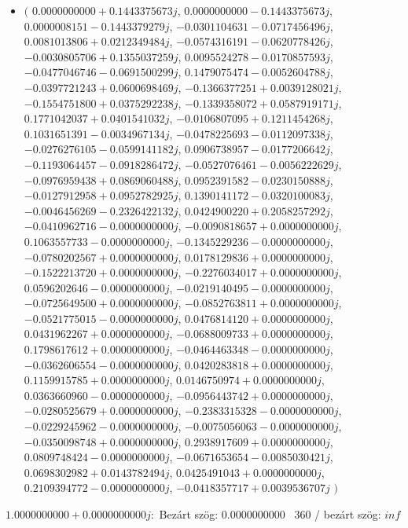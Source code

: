 \documentclass[14pt,a4paper]{article}
\begin{document}
\begin{itemize}
\item
$\big($
$0.0000000000+0.1443375673j$, $0.0000000000-0.1443375673j$, $0.0000008151-0.1443379279j$, $-0.0301104631-0.0717456496j$, $0.0081013806+0.0212349484j$, $-0.0574316191-0.0620778426j$, $-0.0030805706+0.1355037259j$, $0.0095524278-0.0170857593j$, $-0.0477046746-0.0691500299j$, $0.1479075474-0.0052604788j$, $-0.0397721243+0.0600698469j$, $-0.1366377251+0.0039128021j$, $-0.1554751800+0.0375292238j$, $-0.1339358072+0.0587919171j$, $0.1771042037+0.0401541032j$, $-0.0106807095+0.1211454268j$, $0.1031651391-0.0034967134j$, $-0.0478225693-0.0112097338j$, $-0.0276276105-0.0599141182j$, $0.0906738957-0.0177206642j$, $-0.1193064457-0.0918286472j$, $-0.0527076461-0.0056222629j$, $-0.0976959438+0.0869060488j$, $0.0952391582-0.0230150888j$, $-0.0127912958+0.0952782925j$, $0.1390141172-0.0320100083j$, $-0.0046456269-0.2326422132j$, $0.0424900220+0.2058257292j$, $-0.0410962716-0.0000000000j$, $-0.0090818657+0.0000000000j$, $0.1063557733-0.0000000000j$, $-0.1345229236-0.0000000000j$, $-0.0780202567+0.0000000000j$, $0.0178129836+0.0000000000j$, $-0.1522213720+0.0000000000j$, $-0.2276034017+0.0000000000j$, $0.0596202646-0.0000000000j$, $-0.0219140495-0.0000000000j$, $-0.0725649500+0.0000000000j$, $-0.0852763811+0.0000000000j$, $-0.0521775015-0.0000000000j$, $0.0476814120+0.0000000000j$, $0.0431962267+0.0000000000j$, $-0.0688009733+0.0000000000j$, $0.1798617612+0.0000000000j$, $-0.0464463348-0.0000000000j$, $-0.0362606554-0.0000000000j$, $0.0420283818+0.0000000000j$, $0.1159915785+0.0000000000j$, $0.0146750974+0.0000000000j$, $0.0363660960-0.0000000000j$, $-0.0956443742+0.0000000000j$, $-0.0280525679+0.0000000000j$, $-0.2383315328-0.0000000000j$, $-0.0229245962-0.0000000000j$, $-0.0075056063-0.0000000000j$, $-0.0350098748+0.0000000000j$, $0.2938917609+0.0000000000j$, $0.0809748424-0.0000000000j$, $-0.0671653654-0.0085030421j$, $0.0698302982+0.0143782494j$, $0.0425491043+0.0000000000j$, $0.2109394772-0.0000000000j$, $-0.0418357717+0.0039536707j$
$\big)$
\end{itemize}
$1.0000000000+0.0000000000j$:\
Bezárt szög: $0.0000000000$ \
360 / bezárt szög: $inf$\
\end{document}
